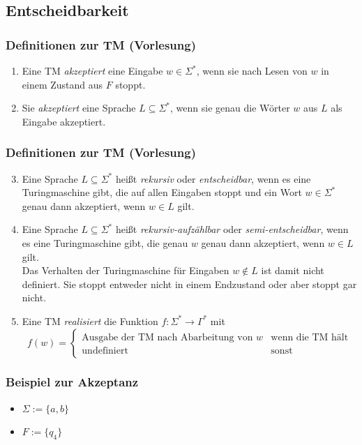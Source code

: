 \subsection{Entscheidbarkeit}
\begin{frame}
 \frametitle{Definitionen zur TM (Vorlesung)}
 \begin{enumerate}
  \item Eine TM \emph{akzeptiert} eine Eingabe $w \in \Sigma^*$, wenn sie nach Lesen von $w$ in einem Zustand aus $F$ stoppt.
  \item Sie \emph{akzeptiert} eine Sprache $L \subseteq \Sigma^*$, wenn sie genau die Wörter $w$ aus $L$ als Eingabe akzeptiert.
\end{enumerate}
\end{frame}
\begin{frame}
 \frametitle{Definitionen zur TM (Vorlesung)}
 \begin{enumerate}
 \setcounter{enumi}{2}
 \item Eine Sprache $L \subseteq \Sigma^*$ heißt \emph{rekursiv} oder \emph{entscheidbar}, wenn es eine Turingmaschine gibt, die auf allen Eingaben stoppt und
	ein Wort $w \in \Sigma^*$ genau dann akzeptiert, wenn $w \in L$ gilt.
  \item Eine Sprache $L \subseteq \Sigma^*$ heißt \emph{rekursiv-aufzählbar} oder \emph{semi-entscheidbar}, wenn es eine Turingmaschine gibt, 
	die genau $w$ genau dann akzeptiert, wenn $w \in L$ gilt. \\ Das Verhalten der Turingmaschine für Eingaben $w \not\in L$ ist damit nicht definiert.
	Sie stoppt entweder nicht in einem Endzustand oder aber stoppt gar nicht.
	\item Eine TM \emph{realisiert} die Funktion $f: \Sigma^* \rightarrow \Gamma^*$ mit $$f(w) = \begin{cases} \text{Ausgabe der TM nach Abarbeitung von } w & \text{wenn die TM hält} \\ \text{undefiniert} & \text{sonst} \end{cases}$$
 \end{enumerate}
\end{frame}

\begin{frame}
 \frametitle{Beispiel zur Akzeptanz}
 \begin{itemize}
  \item $\Sigma := \{a, b\}$  
  \item $F := \{q_4\}$
  
  \ducttape{-1cm} 
  \thetm
 \end{itemize}
 
 \end{frame}

